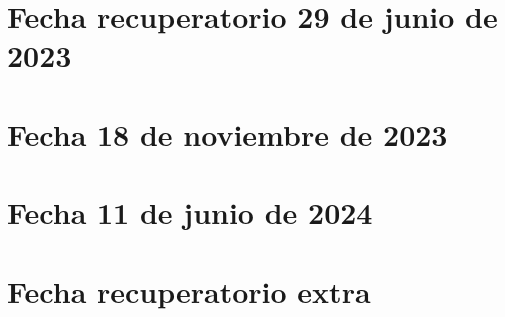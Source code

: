 \documentclass[10pt, a4paper]{report}
\begin{document}
        \newpage
        \section{Fecha recuperatorio 29 de junio de 2023}
            

        \newpage
        \section{Fecha 18 de noviembre de 2023}
            

        \newpage
        \section{Fecha 11 de junio de 2024}
            

        \newpage
        \section{Fecha recuperatorio extra}
            
    
\end{document}
